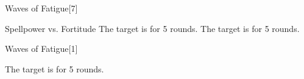 \begin{spellsection}[Greater]{Waves of Fatigue}[7]
    \begin{spellheader}
    \end{spellheader}
    \begin{spellcontent}
        \begin{spelltargetinginfo}
        \end{spelltargetinginfo}
        \begin{spelleffects}
            \begin{spellattack}{Spellpower vs. Fortitude}
                \spellsuccess The target is \exhausted for 5 rounds.
                \spellfailure The target is \fatigued for 5 rounds.
            \end{spellattack}
        \end{spelleffects}
    \end{spellcontent}
    \begin{spellfooter}
        \miscastexplode
    \end{spellfooter}
\end{spellsection}

\begin{spellsection}[Lesser]{Waves of Fatigue}[1]
    \begin{spellheader}
    \end{spellheader}
    \begin{spellcontent}
        \begin{spelltargetinginfo}
        \end{spelltargetinginfo}
        \begin{spelleffects}
            \spelleffect The target is \fatigued for 5 rounds.
        \end{spelleffects}
    \end{spellcontent}
    \begin{spellfooter}
        \miscastexplode
    \end{spellfooter}
\end{spellsection}

